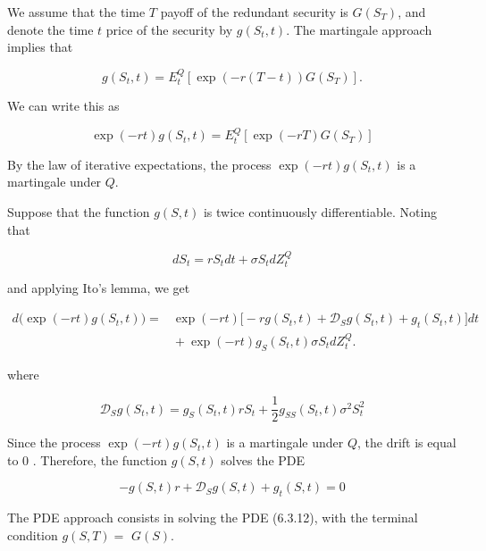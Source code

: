 \documentclass[\topdir/lecture\_notes.tex]{subfiles}
\begin{document}
We assume that the time \(T\) payoff of the redundant security is \(G\left(S_{T}\right)\), and denote the time \(t\) price of the security by \(g\left(S_{t}, t\right)\). The martingale approach implies that

\begin{equation}
g\left(S_{t}, t\right)=E_{t}^{Q}\left[\exp (-r(T-t)) G\left(S_{T}\right)\right] .
\end{equation}

We can write this as

\begin{equation}
\exp (-r t) g\left(S_{t}, t\right)=E_{t}^{Q}\left[\exp (-r T) G\left(S_{T}\right)\right] \label{eq:6.3.9}
\end{equation}

By the law of iterative expectations, the process \(\exp (-r t) g\left(S_{t}, t\right)\) is a martingale under \(Q\).

Suppose that the function \(g(S, t)\) is twice continuously differentiable. Noting that

\begin{equation}
d S_{t}=r S_{t} d t+\sigma S_{t} d Z_{t}^{Q}
\end{equation}

and applying Ito's lemma, we get

\begin{align}
d\big(\exp (-r t) g(S_{t}, t)\big)={}& \exp (-r t)\Big[-r g(S_{t}, t)+\mathcal{D}_{S} g(S_{t}, t)+g_{t}(S_{t}, t)\Big] d t \nonumber \\
&{}+ \exp (-r t) g_{S}(S_{t}, t) \sigma S_{t} d Z_{t}^{Q}. \label{eq:6.3.10}
\end{align}

where

\begin{equation}
\mathcal{D}_{S} g\left(S_{t}, t\right)=g_{S}\left(S_{t}, t\right) r S_{t}+\frac{1}{2} g_{S S}\left(S_{t}, t\right) \sigma^{2} S_{t}^{2} \label{eq:6.3.11}
\end{equation}

Since the process \(\exp (-r t) g\left(S_{t}, t\right)\) is a martingale under \(Q\), the drift is equal to 0 . Therefore, the function \(g(S, t)\) solves the PDE

\begin{equation}
-g(S, t) r+\mathcal{D}_{S} g(S, t)+g_{t}(S, t)=0 \label{eq:6.3.12}
\end{equation}

The PDE approach consists in solving the PDE (6.3.12), with the terminal condition \(g(S, T)=\) \(G(S)\).
\end{document}
